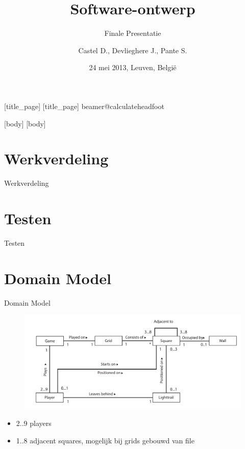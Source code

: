\documentclass[11pt,t]{beamer}
\title{Software-ontwerp}
\author{Castel D., Devlieghere J., Pante S.}
\institute{Groep 25, Computerwetenschappen, KU Leuven}
\subtitle{Finale Presentatie}
\date{24 mei 2013, Leuven, Belgi\"{e}}
\begin{document}
	[title_page]
	[title_page]
	\csname beamer@calculateheadfoot\endcsname %
		\begin{frame}
			\titlepage
		\end{frame}
	[body]
	[body]

\section{Werkverdeling}

\begin{frame}{Werkverdeling}
\end{frame}

\section{Testen}

\begin{frame}{Testen}
\end{frame}

\section{Domain Model}



\begin{frame}{Domain Model}

\begin{center}
\begin{figure}
\includegraphics[width=0.9\linewidth]{images/domainmodel2}
\end{figure}
\end{center}
\begin{itemize}
\item 2..9 players
\item 1..8 adjacent squares, mogelijk bij grids gebouwd van file
\end{itemize}
\end{frame}
\end{document}
